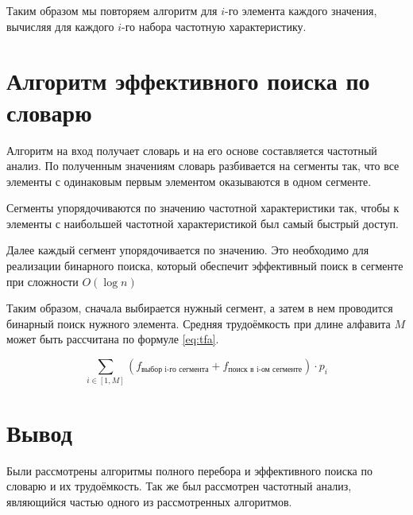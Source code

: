 Таким образом мы повторяем алгоритм для $i$-го элемента каждого значения, вычисляя для каждого $i$-го набора частотную характеристику.

\section{Алгоритм эффективного поиска по словарю}

Алгоритм на вход получает словарь и на его основе составляется частотный анализ. По полученным значениям словарь разбивается на сегменты так, что все элементы с одинаковым первым элементом оказываются в одном сегменте. 

Сегменты упорядочиваются по значению частотной характеристики так, чтобы к элементы с наибольшей частотной характеристикой был самый быстрый доступ. 

Далее каждый сегмент упорядочивается по значению. Это необходимо для реализации бинарного поиска, который обеспечит эффективный поиск в сегменте при сложности $O(\log n)$

Таким образом, сначала выбирается нужный сегмент, а затем в нем проводится бинарный поиск нужного элемента. Средняя трудоёмкость при длине алфавита $M$ может быть рассчитана по формуле \ref{eq:tfa}. 

\begin{equation} \label{eq:tfa}
	\sum\limits_{i\in[1, M]} (f_{\text{выбор i-го сегмента}}+f_{\text{поиск в i-ом сегменте}}) \cdot p_i
\end{equation}


\section*{Вывод}

Были рассмотрены алгоритмы полного перебора и эффективного поиска по словарю и их трудоёмкость. Так же был рассмотрен частотный анализ, являющийся частью одного из рассмотренных алгоритмов.
